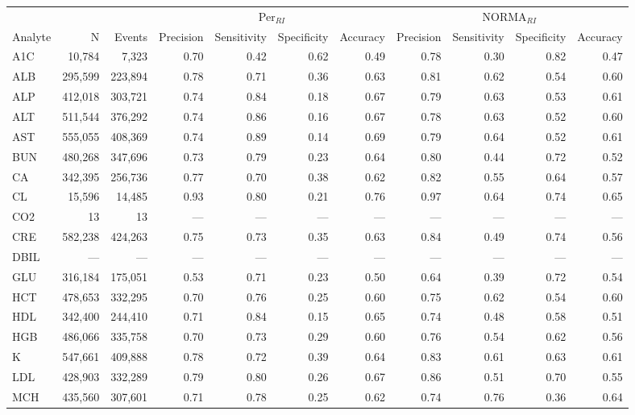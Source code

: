 \begin{table}[ht]
\centering
\footnotesize
\begin{tabular}{lrrrrrrrrrr}
\toprule
 & &  & \multicolumn{4}{c}{Per$_{RI}$} & \multicolumn{4}{c}{NORMA$_{RI}$} \\
\cmidrule(lr){4-7} \cmidrule(lr){8-11}
Analyte & N & Events & Precision & Sensitivity & Specificity & Accuracy & Precision & Sensitivity & Specificity & Accuracy \\
\midrule
A1C & 10,784 & 7,323 & 0.70 & 0.42 & 0.62 & 0.49 & 0.78 & 0.30 & 0.82 & 0.47 \\
ALB & 295,599 & 223,894 & 0.78 & 0.71 & 0.36 & 0.63 & 0.81 & 0.62 & 0.54 & 0.60 \\
ALP & 412,018 & 303,721 & 0.74 & 0.84 & 0.18 & 0.67 & 0.79 & 0.63 & 0.53 & 0.61 \\
ALT & 511,544 & 376,292 & 0.74 & 0.86 & 0.16 & 0.67 & 0.78 & 0.63 & 0.52 & 0.60 \\
AST & 555,055 & 408,369 & 0.74 & 0.89 & 0.14 & 0.69 & 0.79 & 0.64 & 0.52 & 0.61 \\
BUN & 480,268 & 347,696 & 0.73 & 0.79 & 0.23 & 0.64 & 0.80 & 0.44 & 0.72 & 0.52 \\
CA & 342,395 & 256,736 & 0.77 & 0.70 & 0.38 & 0.62 & 0.82 & 0.55 & 0.64 & 0.57 \\
CL & 15,596 & 14,485 & 0.93 & 0.80 & 0.21 & 0.76 & 0.97 & 0.64 & 0.74 & 0.65 \\
CO2 & 13 & 13 & --- & --- & --- & --- & --- & --- & --- & --- \\
CRE & 582,238 & 424,263 & 0.75 & 0.73 & 0.35 & 0.63 & 0.84 & 0.49 & 0.74 & 0.56 \\
DBIL & --- & --- & --- & --- & --- & --- & --- & --- & --- & --- \\
GLU & 316,184 & 175,051 & 0.53 & 0.71 & 0.23 & 0.50 & 0.64 & 0.39 & 0.72 & 0.54 \\
HCT & 478,653 & 332,295 & 0.70 & 0.76 & 0.25 & 0.60 & 0.75 & 0.62 & 0.54 & 0.60 \\
HDL & 342,400 & 244,410 & 0.71 & 0.84 & 0.15 & 0.65 & 0.74 & 0.48 & 0.58 & 0.51 \\
HGB & 486,066 & 335,758 & 0.70 & 0.73 & 0.29 & 0.60 & 0.76 & 0.54 & 0.62 & 0.56 \\
K & 547,661 & 409,888 & 0.78 & 0.72 & 0.39 & 0.64 & 0.83 & 0.61 & 0.63 & 0.61 \\
LDL & 428,903 & 332,289 & 0.79 & 0.80 & 0.26 & 0.67 & 0.86 & 0.51 & 0.70 & 0.55 \\
MCH & 435,560 & 307,601 & 0.71 & 0.78 & 0.25 & 0.62 & 0.74 & 0.76 & 0.36 & 0.64 \\

\end{tabular}
\end{table}
